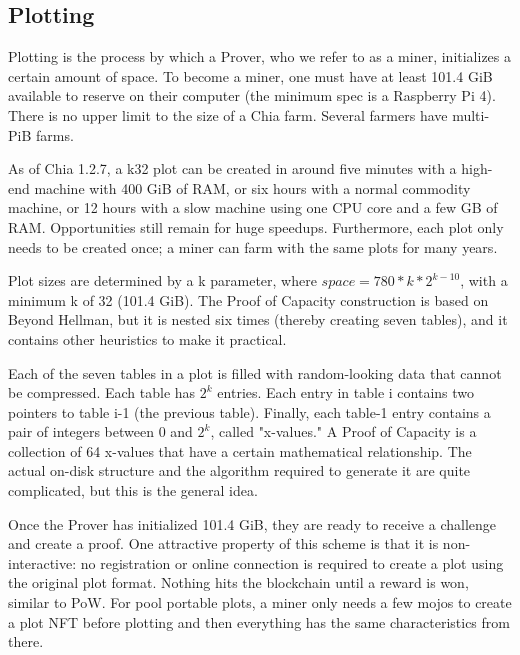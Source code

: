 \subsection{Plotting}
\begin{flushleft}
    Plotting is the process by which a Prover, who we refer to as a miner, initializes a certain amount of space. To become a miner, one must have at least 101.4 GiB available to reserve on their computer (the minimum spec is a Raspberry Pi 4). There is no upper limit to the size of a Chia farm. Several farmers have multi-PiB farms.
\end{flushleft}
\begin{flushleft}
    As of Chia 1.2.7, a k32 plot can be created in around five minutes with a high-end machine with 400 GiB of RAM, or six hours with a normal commodity machine, or 12 hours with a slow machine using one CPU core and a few GB of RAM. Opportunities still remain for huge speedups. Furthermore, each plot only needs to be created once; a miner can farm with the same plots for many years.
\end{flushleft}
\begin{flushleft}
    Plot sizes are determined by a k parameter, where $space = 780 * k * 2^{k - 10}$, with a minimum k of 32 (101.4 GiB). The Proof of Capacity construction is based on Beyond Hellman, but it is nested six times (thereby creating seven tables), and it contains other heuristics to make it practical.
\end{flushleft}
\begin{flushleft}
    Each of the seven tables in a plot is filled with random-looking data that cannot be compressed. Each table has $2^k$ entries. Each entry in table i contains two pointers to table i-1 (the previous table). Finally, each table-1 entry contains a pair of integers between 0 and $2^k$, called "x-values." A Proof of Capacity is a collection of 64 x-values that have a certain mathematical relationship. The actual on-disk structure and the algorithm required to generate it are quite complicated, but this is the general idea.
\end{flushleft}
\begin{flushleft}
    Once the Prover has initialized 101.4 GiB, they are ready to receive a challenge and create a proof. One attractive property of this scheme is that it is non-interactive: no registration or online connection is required to create a plot using the original plot format. Nothing hits the blockchain until a reward is won, similar to PoW. For pool portable plots, a miner only needs a few mojos to create a plot NFT before plotting and then everything has the same characteristics from there.
\end{flushleft}
